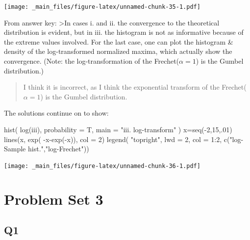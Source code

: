 \documentclass[
  oneside]{book}
\newenvironment{Shaded}{\begin{snugshade}}{\end{snugshade}}
\newcommand{\AttributeTok}[1]{\textcolor[rgb]{0.77,0.63,0.00}{#1}}
\newcommand{\DecValTok}[1]{\textcolor[rgb]{0.00,0.00,0.81}{#1}}
\newcommand{\FunctionTok}[1]{\textcolor[rgb]{0.00,0.00,0.00}{#1}}
\newcommand{\NormalTok}[1]{#1}
\newcommand{\OtherTok}[1]{\textcolor[rgb]{0.56,0.35,0.01}{#1}}
\newcommand{\SpecialCharTok}[1]{\textcolor[rgb]{0.00,0.00,0.00}{#1}}
\newcommand{\StringTok}[1]{\textcolor[rgb]{0.31,0.60,0.02}{#1}}
\begin{document}
\texttt{[image: \_main\_files/figure-latex/unnamed-chunk-35-1.pdf]}

From answer key:
\textgreater In cases i. and ii. the convergence to the theoretical distribution is evident, but in iii. the histogram is not as informative because of the extreme values involved. For the last case, one can plot the histogram \& density of the log-transformed normalized maxima, which actually show the convergence.
(Note: the log-transformation of the Frechet(\(\alpha=1\)) is the Gumbel distribution.)

\begin{quote}
I think it is incorrect, as I think the exponential transform of the Frechet(\(\alpha=1\)) is the Gumbel distribution.
\end{quote}

The solutions continue on to show:

\begin{Shaded}
\begin{Highlighting}[]
\FunctionTok{hist}\NormalTok{( }\FunctionTok{log}\NormalTok{(iii), }\AttributeTok{probability =}\NormalTok{ T, }\AttributeTok{main =} \StringTok{"iii. log{-}transform"}\NormalTok{ )}
\NormalTok{x}\OtherTok{=}\FunctionTok{seq}\NormalTok{(}\SpecialCharTok{{-}}\DecValTok{2}\NormalTok{,}\DecValTok{15}\NormalTok{,.}\DecValTok{01}\NormalTok{)}
\FunctionTok{lines}\NormalTok{(x, }\FunctionTok{exp}\NormalTok{( }\SpecialCharTok{{-}}\NormalTok{x}\SpecialCharTok{{-}}\FunctionTok{exp}\NormalTok{(}\SpecialCharTok{{-}}\NormalTok{x)), }\AttributeTok{col =} \DecValTok{2}\NormalTok{)}
\FunctionTok{legend}\NormalTok{( }\StringTok{"topright"}\NormalTok{, }\AttributeTok{lwd =} \DecValTok{2}\NormalTok{, }\AttributeTok{col =} \DecValTok{1}\SpecialCharTok{:}\DecValTok{2}\NormalTok{, }\FunctionTok{c}\NormalTok{(}\StringTok{"log{-}Sample hist."}\NormalTok{,}\StringTok{"log{-}Frechet"}\NormalTok{))}
\end{Highlighting}
\end{Shaded}

\texttt{[image: \_main\_files/figure-latex/unnamed-chunk-36-1.pdf]}

\hypertarget{problem-set-3}{%
\chapter{Problem Set 3}\label{problem-set-3}}

\hypertarget{q1-2}{%
\section{Q1}\label{q1-2}}
\end{document}
